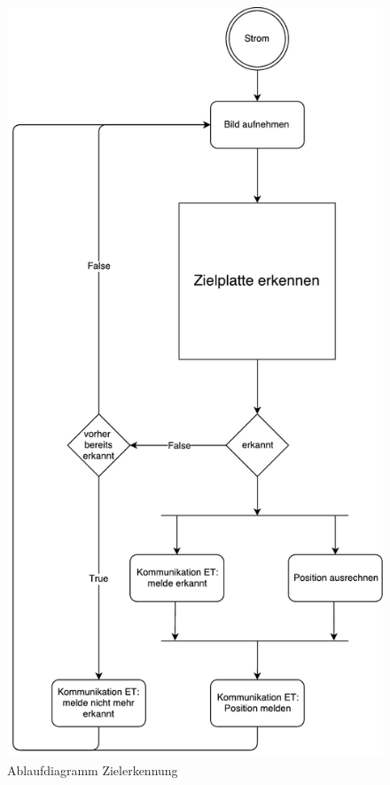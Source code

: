 \documentclass[a4paper]{report}
\begin{document}
\begin{figure}[h!]
	\centering
	\includegraphics[keepaspectratio,height=0.8\textheight]{Ablaufdiagramm_ModusOperandi}
	\caption{Ablaufdiagramm Zielerkennung}
	\label{fig:AblaufZielerkennung}
\end{figure}
\end{document}
